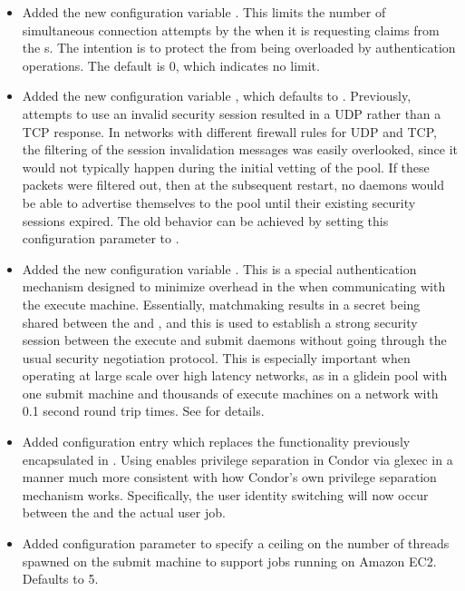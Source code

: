 \begin{itemize}

\item Added the new configuration variable
.  This limits the
number of simultaneous connection attempts by the  when
it is requesting claims from the s.  The intention is
to protect the  from being overloaded by authentication
operations.  The default is 0, which indicates no limit.

\item Added the new configuration variable
,  which
defaults to .  Previously, attempts to use an invalid security
session resulted in a UDP rather than a TCP response.  In networks with
different firewall rules for UDP and TCP, the filtering of the session
invalidation messages was easily overlooked, since it would not
typically happen during the initial vetting of the pool.  If these
packets were filtered out, then at the subsequent 
restart, no daemons would be able to advertise themselves to the
pool until their existing security sessions expired.  The old behavior
can be achieved by setting this configuration parameter to .

\item Added the new configuration variable
.
This is a special authentication mechanism designed to minimize
overhead in the  when communicating with the execute
machine.  Essentially, matchmaking results in a secret being shared
between the  and , and this is used to
establish a strong security session between the execute and submit
daemons without going through the usual security negotiation protocol.
This is especially important when operating at large scale over high
latency networks, as in a glidein pool with one submit machine and thousands of
execute machines on a network with 0.1 second round trip times.  See
\pageref{param:SecEnableMatchPasswordAuthentication} for
details.

\item Added configuration entry  which replaces the
functionality previously encapsulated in .  Using
 enables privilege separation in Condor via glexec in a
manner much more consistent with how Condor's own privilege separation
mechanism works.  Specifically, the user identity switching will now occur
between the  and the actual user job.

\item Added configuration parameter 
to specify a ceiling on the number of threads spawned on the submit
machine to support jobs running on Amazon EC2.  Defaults to 5.

\end{itemize}

